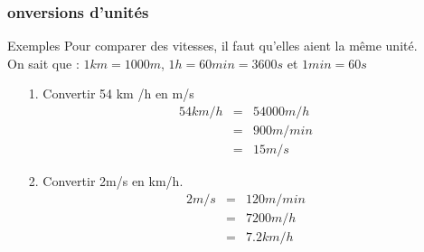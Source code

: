 \documentclass{beamer}
\begin{document}
\begin{frame}
  \frametitle{onversions d'unités}

  \begin{exampleblock}{Exemples}
    Pour comparer des vitesses, il faut qu'elles aient la même unité. \\On sait que : $1km = 1000m$, $1h = 60min = 3600s$ et $1min = 60s$

    \begin{multicols}{2}
      \begin{enumerate}
      \item[1.] Convertir 54 km /h en m/s
        \begin{eqnarray*}
          54 km /h &=& 54 000 m/h\\
          &=& 900 m/min\\
          &=& 15 m/s
        \end{eqnarray*}

      \item[2.] Convertir 2m/s en km/h.
        \begin{eqnarray*}
          2 m /s &=& 120  m /min\\
          &=& 7200 m /h\\
          &=& 7.2 km /h
        \end{eqnarray*}
      \end{enumerate}
    \end{multicols}
  \end{exampleblock}
  
\end{frame}
\end{document}
